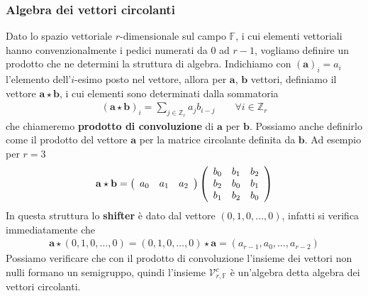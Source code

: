
\subsubsection{Algebra dei vettori circolanti}

Dato lo spazio vettoriale $r$-dimensionale sul campo $\mathbb{F}$, i cui
elementi vettoriali hanno convenzionalmente i pedici numerati da $0$ ad $r-1$,
vogliamo definire un prodotto che ne determini la struttura di algebra. Indichiamo con $(\mathbf{a})_{i} = a_{i}$
l'elemento dell'$i$-esimo posto nel vettore, allora per $\mathbf{a}$, $\mathbf{b}$ vettori, definiamo il vettore $\mathbf{a} \star \mathbf{b}$, i cui
elementi sono determinati dalla sommatoria
\begin{align*}
(\mathbf{a} \star \mathbf{b})_{i} = \sum_{j \in \mathbb{Z}_{r} } a_{j} b_{i-j}
\qquad \forall i \in \mathbb{Z}_{r}
\end{align*}
che chiameremo {\bf prodotto di convoluzione} di $\mathbf{a}$ per $\mathbf{b}$.
Possiamo anche definirlo come il prodotto del vettore $\mathbf{a}$ per la matrice
circolante definita da $\mathbf{b}$. Ad esempio per $r = 3$
\begin{align*}
\mathbf{a} \star \mathbf{b} = 
\left(
\begin{array} {c c c }
a_0 & a_1 & a_2    
\end{array}
\right) 
\left(
\begin{array} {c c c}
b_0 & b_1 & b_2   \\
b_2 & b_0 & b_1   \\
b_1 & b_2 & b_0        
\end{array}
\right)
\end{align*}
In questa struttura lo {\bf shifter} è dato dal vettore $(0,1,0,\dots, 0)$,
infatti si verifica immediatamente che 
\begin{align*}
\mathbf{a} \star (0,1,0,\dots, 0) =  (0,1,0,\dots, 0) \star \mathbf{a} = 
(a_{r-1}, a_0,  \dots , a_{r-2} )
\end{align*}
Possiamo verificare che con il prodotto di convoluzione
l'insieme dei vettori non nulli formano un semigruppo, quindi
l'insieme $\mathcal{V}_{r,\mathbb{F} }^{c}$ è un'algebra
detta algebra dei vettori circolanti.


